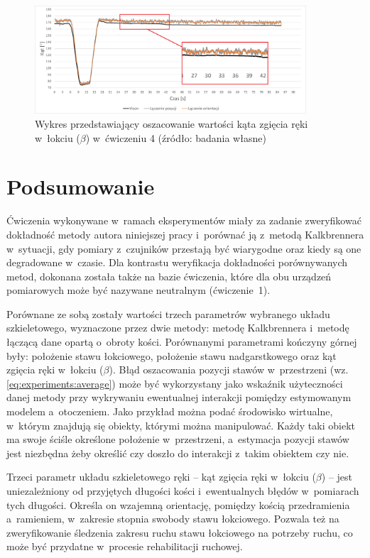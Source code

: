 \begin{figure}[!htb]
	\centering
	\includegraphics[width=0.9\textwidth]{images/400/angle.png}
	\caption{Wykres przedstawiający oszacowanie wartości kąta zgięcia ręki w~łokciu ($\beta$) w~ćwiczeniu 4 (źródło: badania własne)}
	\label{fig:experiments:fourth:angle}
\end{figure}
														
\section{Podsumowanie}																								
Ćwiczenia wykonywane w~ramach eksperymentów miały za zadanie zweryfikować dokładność metody autora niniejszej pracy i~porównać ją z~metodą Kalkbrennera w~sytuacji, gdy pomiary z~czujników przestają być wiarygodne oraz kiedy są one degradowane w~czasie. Dla kontrastu weryfikacja dokładności porównywanych metod, dokonana została także na bazie ćwiczenia, które dla obu urządzeń pomiarowych może być nazywane neutralnym (ćwiczenie~1).
																								
Porównane ze sobą zostały wartości trzech parametrów wybranego układu szkieletowego, wyznaczone przez dwie metody: metodę Kalkbrennera i~metodę łączącą dane opartą o~obroty kości. Porównanymi parametrami kończyny górnej były: położenie stawu łokciowego, położenie stawu nadgarstkowego oraz kąt zgięcia ręki w~łokciu ($\beta$). Błąd oszacowania pozycji stawów w~przestrzeni (wz. \ref{eq:experiments:average}) może być wykorzystany jako wskaźnik użyteczności danej metody przy wykrywaniu ewentualnej interakcji pomiędzy estymowanym modelem a~otoczeniem. Jako przykład można podać środowisko wirtualne, w~którym znajdują się obiekty, którymi można manipulować. Każdy taki obiekt ma swoje ściśle określone położenie w~przestrzeni, a~estymacja pozycji stawów jest niezbędna żeby określić czy doszło do interakcji z~takim obiektem czy nie.
																								 
Trzeci parametr układu szkieletowego ręki -- kąt zgięcia ręki w~łokciu ($\beta$) -- jest uniezależniony od przyjętych długości kości i~ewentualnych błędów w~pomiarach tych długości. Określa on wzajemną orientację, pomiędzy kością przedramienia a~ramieniem, w~zakresie stopnia swobody stawu łokciowego. Pozwala też na zweryfikowanie śledzenia zakresu ruchu stawu łokciowego na potrzeby ruchu, co może być przydatne w~procesie rehabilitacji ruchowej. 

